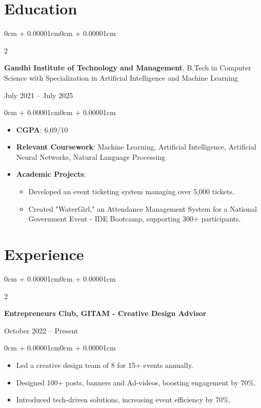 \documentclass[10pt,letterpaper]{article}
\newenvironment{highlights}{
    \begin{itemize}[
        topsep=0.05cm,
        parsep=0.05cm,
        partopsep=0pt,
        itemsep=0pt,
        leftmargin=8pt
    ]
}{
    \end{itemize}
}
\newenvironment{onecolentry}{
    \begin{adjustwidth}{0cm + 0.00001cm}{0cm + 0.00001cm}
}{
    \end{adjustwidth}
}
\newenvironment{twocolentry}[2][]{
    \onecolentry
    \def\secondColumn{#2}
    \setcolumnwidth{\fill, 4.0cm}
    \begin{paracol}{2}
}{
    \switchcolumn \raggedleft \secondColumn
    \end{paracol}
    \endonecolentry
}
\begin{document}
    \section{Education}
    \begin{twocolentry}{July 2021 – July 2025}
        \textbf{Gandhi Institute of Technology and Management}, B.Tech in Computer Science with Specialization in Artificial Intelligence and Machine Learning
    \end{twocolentry}
    \begin{onecolentry}
        \begin{highlights}
            \item \textbf{CGPA}: 6.69/10
            \item \textbf{Relevant Coursework}: Machine Learning, Artificial Intelligence, Artificial Neural Networks, Natural Language Processing
            \item \textbf{Academic Projects}:
            \begin{highlights}
                \item Developed an event ticketing system managing over 5,000 tickets.
                \item Created "WaterGirl," an Attendance Management System for a National Government Event - IDE Bootcamp, supporting 300+ participants.
            \end{highlights}
        \end{highlights}
    \end{onecolentry}

    \section{Experience}
    \begin{twocolentry}{October 2022 – Present}
        \textbf{Entrepreneurs Club, GITAM - Creative Design Advisor} 
    \end{twocolentry}
    \begin{onecolentry}
        \begin{highlights}
            \item Led a creative design team of 8 for 15+ events annually.
            \item Designed 100+ posts, banners and Ad-videos, boosting engagement by 70\%.
            \item Introduced tech-driven solutions, increasing event efficiency by 70\%.
        \end{highlights}
    \end{onecolentry}
    
\end{document}
